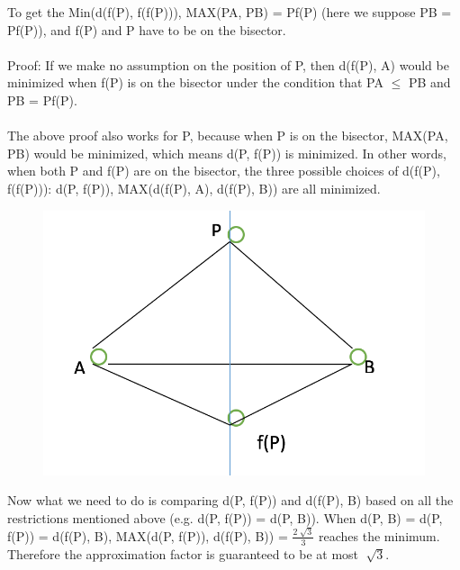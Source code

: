\begin{problem}{5}
\begin{figure}[H]
\end{figure}
To get the Min(d(f(P), f(f(P))), MAX(PA, PB) = Pf(P) (here we suppose PB = Pf(P)), and f(P) and P have to be on the bisector.\\
\\
Proof: If we make no assumption on the position of P, then d(f(P), A) would be minimized when f(P) is on the bisector under the condition that PA $\leq$ PB and PB = Pf(P).\\
\\
The above proof also works for P, because when P is on the bisector, MAX(PA, PB) would be minimized, which means d(P, f(P)) is minimized. In other words, when both P and f(P) are on the bisector, the three possible choices of d(f(P), f(f(P))): d(P, f(P)), MAX(d(f(P), A), d(f(P), B)) are all minimized.\\
\begin{figure}[H] 
\centering 
\includegraphics[width=0.5\columnwidth]{3}
\end{figure}
Now what we need to do is comparing d(P, f(P)) and d(f(P), B) based on all the restrictions mentioned above (e.g. d(P, f(P)) = d(P, B)). When d(P, B) = d(P, f(P)) = d(f(P), B), MAX(d(P, f(P)), d(f(P), B)) = $\frac{2\sqrt[]{3}}{3}$ reaches the minimum. Therefore the approximation factor is guaranteed to be at most $\sqrt[]{3}$.
\end{problem}